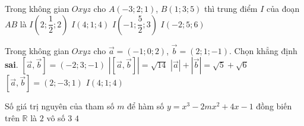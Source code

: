 \begin{ex}%
	Trong không gian $Oxyz$ cho $A(-3;2;1)$, $B(1;3;5)$ thì trung điểm $I$ của đoạn $AB$ là
	\choice
	{$I\left(2;\dfrac{1}{2};2\right)$}
	{$I(4;1;4)$}
	{\True $I\left(-1;\dfrac{5}{2};3\right)$}
	{$I(-2;5;6)$}
\end{ex}


\begin{ex}%
	Trong không gian $Oxyz$ cho $\overrightarrow{a}=(-1;0;2)$, $\overrightarrow{b}=(2;1;-1)$. Chọn khẳng định \textbf{sai}.
	\choice
	{$\left[\overrightarrow{a},\overrightarrow{b}\right]=(-2;3;-1)$}
	{$\left|\left[\overrightarrow{a},\overrightarrow{b}\right]\right|=\sqrt{14}$}
	{$\left|\overrightarrow{a}\right|+\left|\overrightarrow{b}\right|=\sqrt{5}+\sqrt{6}$}
	{\True $\left[\overrightarrow{a},\overrightarrow{b}\right]=(2;-3;1)$}
	{$I(4;1;4)$}
\end{ex}

\begin{ex}%
	Số giá trị nguyên của tham số $m$ để hàm số $y=x^3-2mx^2+4x-1$ đồng biến trên $\mathbb{R}$ là
	\choice
	{$2$}
	{vô số}
	{\True $3$}
	{$4$}
\end{ex}


